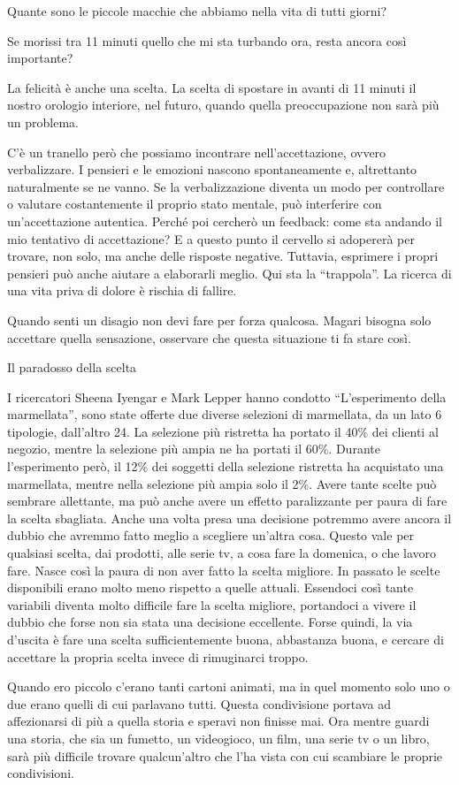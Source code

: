 \documentclass[12pt]{book} %
\begin{document}
Quante sono le piccole macchie che abbiamo nella vita di tutti giorni?

Se morissi tra 11 minuti quello che mi sta turbando ora, resta ancora così importante?

La felicità è anche una scelta. La scelta di spostare in avanti di 11 minuti il nostro orologio
interiore, nel futuro, quando quella preoccupazione non sarà più un problema.

C'è un tranello però che possiamo incontrare nell'accettazione, ovvero verbalizzare. I pensieri e
le emozioni nascono spontaneamente e, altrettanto naturalmente se ne vanno. Se la verbalizzazione diventa un modo per controllare o valutare costantemente il proprio stato mentale, può interferire con un’accettazione autentica. Perché poi cercherò un feedback: come sta andando il mio tentativo di accettazione? E a questo punto il cervello si adopererà per trovare, non solo, ma anche
delle risposte negative. Tuttavia, esprimere i propri pensieri può anche aiutare a elaborarli meglio. Qui sta la “trappola”. La ricerca di una vita priva di dolore è rischia di fallire. 

Quando senti un disagio non devi fare per forza qualcosa. Magari bisogna solo accettare quella sensazione, osservare che
questa situazione ti fa stare così.

\begin{mdframed}[linewidth=1pt]
Il paradosso della scelta

I ricercatori Sheena Iyengar e Mark Lepper hanno condotto “L'esperimento della marmellata”, sono
state offerte due diverse selezioni di marmellata, da un lato 6 tipologie, dall'altro 24. La
selezione più ristretta ha portato il 40\% dei clienti al negozio, mentre la selezione più ampia ne ha portati il 60\%.
Durante l'esperimento però, il 12\% dei soggetti della selezione ristretta ha acquistato una
marmellata, mentre nella selezione più ampia solo il 2\%. Avere tante scelte può sembrare allettante, ma può anche
avere un effetto paralizzante per paura di fare la scelta sbagliata. Anche una volta presa una decisione potremmo avere ancora
il dubbio che avremmo fatto meglio a scegliere un'altra cosa. Questo vale per qualsiasi scelta, dai prodotti, alle
serie tv, a cosa fare la domenica, o che lavoro fare. Nasce così la paura di non aver
fatto la scelta migliore. In passato le scelte disponibili erano molto meno rispetto a quelle attuali. Essendoci così
tante variabili diventa molto difficile fare la scelta migliore, portandoci a vivere il dubbio che forse non sia
stata una decisione eccellente. Forse quindi, la via d'uscita è fare una scelta sufficientemente
buona, abbastanza buona, e cercare di accettare la propria scelta invece di rimuginarci troppo.

Quando ero piccolo c'erano tanti cartoni animati, ma in quel momento solo uno o due erano quelli di cui parlavano tutti. Questa condivisione portava ad affezionarsi di più a quella storia e speravi non finisse mai. Ora mentre guardi una storia, che sia un fumetto, un videogioco, un film, una serie tv o un libro, sarà più difficile trovare qualcun'altro che l'ha vista con cui scambiare le proprie condivisioni.
\end{mdframed}
\end{document}

